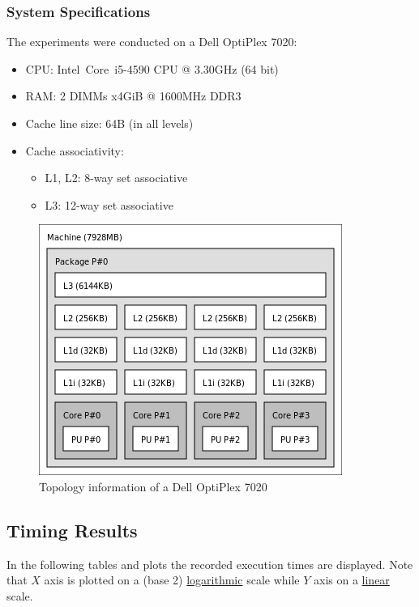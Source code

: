 \documentclass{article}
\begin{document}
\subsubsection{System Specifications}
The experiments were conducted on a Dell OptiPlex 7020:
\begin{itemize}
 \item CPU: Intel\textregistered \ Core\texttrademark \ i5-4590 CPU @ 3.30GHz (64 bit)
 \item RAM: 2 DIMMs x4GiB @ 1600MHz DDR3
 \item Cache line size: 64B (in all levels)
 \item Cache associativity:
 \begin{itemize}
  \item L1, L2: 8-way set associative
  \item L3: 12-way set associative
 \end{itemize}
\end{itemize}

\begin{figure}[htbp]
  \centering
  \includegraphics[width=0.5\columnwidth]{./opti7020-topo.png}
  \caption{Topology information of a Dell OptiPlex 7020}
\end{figure}

\pagebreak

\subsection{Timing Results}
In the following tables and plots the recorded execution times are displayed.
Note that $X$ axis is plotted on a (base 2) \underline{logarithmic} scale while
$Y$ axis on a \underline{linear} scale.

\end{document}
